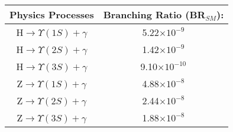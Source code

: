 \begin{tabular}{c|c}
\hline
Physics Processes & Branching Ratio (BR$_{SM}$): \\ \hline
H$\rightarrow  \Upsilon(1S) +\gamma$ & 5.22$\times 10^{-9}$ \\ \hline
H$\rightarrow  \Upsilon(2S) +\gamma$ & 1.42$\times 10^{-9}$ \\ \hline
H$\rightarrow  \Upsilon(3S) +\gamma$ & 9.10$\times 10^{-10}$ \\ \hline \hline
Z$\rightarrow  \Upsilon(1S) +\gamma$ & 4.88$\times 10^{-8}$ \\ \hline
Z$\rightarrow  \Upsilon(2S) +\gamma$ & 2.44$\times 10^{-8}$ \\ \hline
Z$\rightarrow  \Upsilon(3S) +\gamma$ & 1.88$\times 10^{-8}$ \\ \hline 

\end{tabular}


